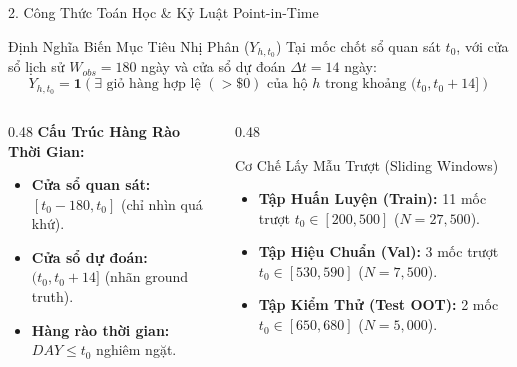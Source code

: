 \documentclass[aspectratio=169, 10pt]{beamer}
\begin{document}
\begin{frame}{2. Công Thức Toán Học \& Kỷ Luật Point-in-Time}
  \begin{block}{Định Nghĩa Biến Mục Tiêu Nhị Phân ($Y_{h, t_0}$)}
    Tại mốc chốt sổ quan sát $t_0$, với cửa sổ lịch sử $W_{obs} = 180$ ngày và cửa sổ dự đoán $\Delta t = 14$ ngày:
    \[
      Y_{h, t_0} = \mathbf{1}\left(\exists \text{ giỏ hàng hợp lệ } (> \$0) \text{ của hộ } h \text{ trong khoảng } (t_0, t_0 + 14]\right)
    \]
  \end{block}
  \vspace{0.1cm}
  \begin{columns}[T]
    \begin{column}{0.48\textwidth}
      \textbf{Cấu Trúc Hàng Rào Thời Gian:}
      \begin{itemize}\setlength{\itemsep}{3pt}
        \item \textbf{Cửa sổ quan sát:} $[t_0 - 180, t_0]$ (chỉ nhìn quá khứ).
        \item \textbf{Cửa sổ dự đoán:} $(t_0, t_0 + 14]$ (nhãn ground truth).
        \item \textbf{Hàng rào thời gian:} $DAY \le t_0$ nghiêm ngặt.
      \end{itemize}
    \end{column}
    \begin{column}{0.48\textwidth}
      \begin{exampleblock}{Cơ Chế Lấy Mẫu Trượt (Sliding Windows)}
        \begin{itemize}\setlength{\itemsep}{3pt}
          \item \textbf{Tập Huấn Luyện (Train):} 11 mốc trượt $t_0 \in [200, 500]$ ($N = 27,500$).
          \item \textbf{Tập Hiệu Chuẩn (Val):} 3 mốc trượt $t_0 \in [530, 590]$ ($N = 7,500$).
          \item \textbf{Tập Kiểm Thử (Test OOT):} 2 mốc $t_0 \in [650, 680]$ ($N = 5,000$).
        \end{itemize}
      \end{exampleblock}
    \end{column}
  \end{columns}
\end{frame}
\end{document}
